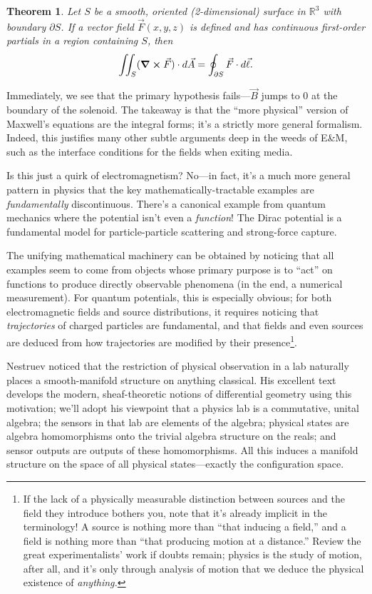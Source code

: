 \documentclass{article}
\newtheorem{thm}{Theorem}
\begin{document}
\begin{thm}
  Let $S$ be a smooth, oriented (2-dimensional) surface in $\mathbb{R}^{3}$ with boundary $\partial S$.
  If a vector field $\vec{F}(x, y, z)$ is defined and has continuous first-order partials in a region containing $S$, then
  \[
    \iint_{S}(\curl{\vec{F}}) \cdot d\vec{A} = \oint_{\partial S}\vec{F} \cdot d\vec{\ell}.
  \]
\end{thm}

Immediately, we see that the primary hypothesis fails---$\vec{B}$ jumps to 0 at the boundary of the solenoid.
The takeaway is that the ``more physical'' version of Maxwell's equations are the integral forms; it's a strictly more general formalism.
Indeed, this justifies many other subtle arguments deep in the weeds of E\&M, such as the interface conditions for the fields when exiting media.

Is this just a quirk of electromagnetism?
No---in fact, it's a much more general pattern in physics that the key mathematically-tractable examples are \textit{fundamentally} discontinuous.
There's a canonical example from quantum mechanics where the potential isn't even a \textit{function}!
The Dirac potential is a fundamental model for particle-particle scattering and strong-force capture.

The unifying mathematical machinery can be obtained by noticing that all examples seem to come from objects whose primary purpose
is to ``act'' on functions to produce directly observable phenomena (in the end, a numerical measurement).
For quantum potentials, this is especially obvious; for both electromagnetic fields and source distributions,
it requires noticing that \textit{trajectories} of charged particles are fundamental,
and that fields and even sources are deduced from how trajectories are modified by their presence\footnote
{
  If the lack of a physically measurable distinction between sources and the field they introduce bothers you,
  note that it's already implicit in the terminology!
  A source is nothing more than ``that inducing a field,'' and a field is nothing more than ``that producing motion at a distance.''
  Review the great experimentalists' work if doubts remain; physics is the study of motion, after all,
  and it's only through analysis of motion that we deduce the physical existence of \textit{anything.}
}.

Nestruev noticed that the restriction of physical observation in a lab naturally places a smooth-manifold structure on anything classical.
His excellent text develops the modern, sheaf-theoretic notions of differential geometry using this motivation;
we'll adopt his viewpoint that a physics lab is a commutative, unital algebra; the sensors in that lab are elements of the algebra;
physical states are algebra homomorphisms onto the trivial algebra structure on the reals; and sensor outputs are outputs of these homomorphisms.
All this induces a manifold structure on the space of all physical states---exactly the configuration space.
\end{document}
